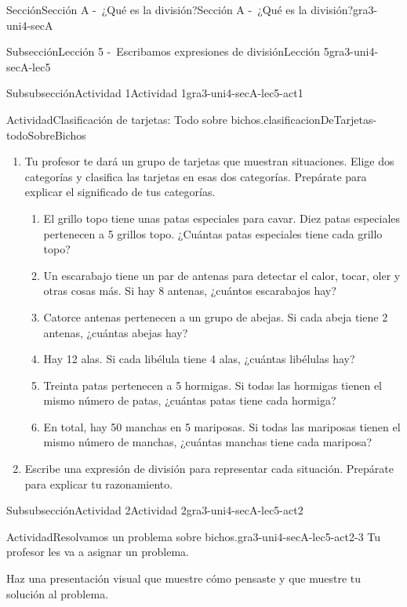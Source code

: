 \documentclass[twoside,10pt,]{article}
\begin{document}
\begin{sectionptx}{Sección}{Sección A -~¿Qué es la división?}{}{Sección A -~¿Qué es la división?}{}{}{gra3-uni4-secA}
\begin{subsectionptx}{Subsección}{Lección 5 -~Escribamos expresiones de división}{}{Lección 5}{}{}{gra3-uni4-secA-lec5}
\begin{subsubsectionptx}{Subsubsección}{Actividad 1}{}{Actividad 1}{}{}{gra3-uni4-secA-lec5-act1}
\begin{activity}{Actividad}{Clasificación de tarjetas: Todo sobre bichos.}{clasificacionDeTarjetas-todoSobreBichos}
\begin{enumerate}
\item{}Tu profesor te dará un grupo de tarjetas que muestran situaciones. Elige dos categorías y clasifica las tarjetas en esas dos categorías. Prepárate para explicar el significado de tus categorías.%
%
\begin{enumerate}[label=(\Alph*)]
\item{}El grillo topo tiene unas patas especiales para cavar. Diez patas especiales pertenecen a 5 grillos topo. ¿Cuántas patas especiales tiene cada grillo topo?%
\item{}Un escarabajo tiene un par de antenas para detectar el calor, tocar, oler y otras cosas más. Si hay 8 antenas, ¿cuántos escarabajos hay?%
\item{}Catorce antenas pertenecen a un grupo de abejas. Si cada abeja tiene 2 antenas, ¿cuántas abejas hay?%
\item{}Hay 12 alas. Si cada libélula tiene 4 alas, ¿cuántas libélulas hay?%
\item{}Treinta patas pertenecen a 5 hormigas. Si todas las hormigas tienen el mismo número de patas, ¿cuántas patas tiene cada hormiga?%
\item{}En total, hay 50 manchas en 5 mariposas. Si todas las mariposas tienen el mismo número de manchas, ¿cuántas manchas tiene cada mariposa?%
\end{enumerate}
\item{}Escribe una expresión de división para representar cada situación. Prepárate para explicar tu razonamiento.%
\end{enumerate}
\end{activity}%
%
\end{subsubsectionptx}
%
%
\typeout{************************************************}
\typeout{************************************************}
%
\begin{subsubsectionptx}{Subsubsección}{Actividad 2}{}{Actividad 2}{}{}{gra3-uni4-secA-lec5-act2}
\begin{activity}{Actividad}{Resolvamos un problema sobre bichos.}{gra3-uni4-secA-lec5-act2-3}%
Tu profesor les va a asignar un problema.%
\par
Haz una presentación visual que muestre cómo pensaste y que muestre tu solución al problema.%
\end{activity}%
\end{subsubsectionptx}

\end{subsectionptx}
\end{sectionptx}
\end{document}
